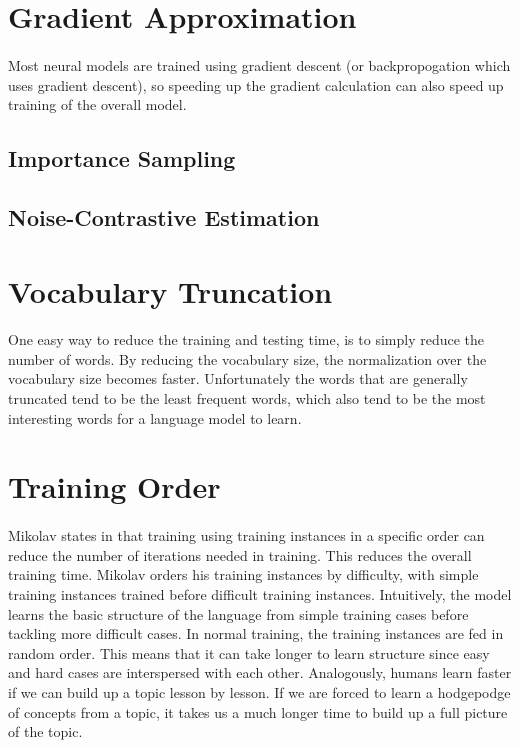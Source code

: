 \documentclass[12pt]{ociamthesis}
\begin{document}
\section{Gradient Approximation}
\paragraph{}
Most neural models are trained using gradient descent (or backpropogation which uses gradient descent), so speeding up the gradient calculation can also speed up training of the overall model.
\subsection{Importance Sampling}
\paragraph{}

\subsection{Noise-Contrastive Estimation}
\paragraph{}


\section{Vocabulary Truncation}
\paragraph{}
One easy way to reduce the training and testing time, is to simply reduce the number of words. By reducing the vocabulary size, the normalization over the vocabulary size becomes faster. Unfortunately the words that are generally truncated tend to be the least frequent words, which also tend to be the most interesting words for a language model to learn.

\section{Training Order}
\paragraph{}
Mikolav states in \cite{Mikolav2012} that training using training instances in a specific order can reduce the number of iterations needed in training. This reduces the overall training time. Mikolav orders his training instances by difficulty, with simple training instances trained before difficult training instances. Intuitively, the model learns the basic structure of the language from simple training cases before tackling more difficult cases. In normal training, the training instances are fed in random order. This means that it can take longer to learn structure since easy and hard cases are interspersed with each other. Analogously, humans learn faster if we can build up a topic lesson by lesson. If we are forced to learn a hodgepodge of concepts from a topic, it takes us a much longer time to build up a full picture of the topic.

 
\end{document}
